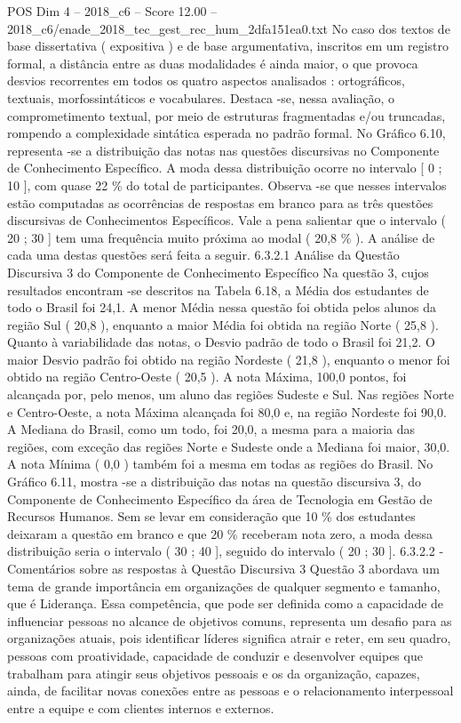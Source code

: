 \begin{textsample}{POS Dim 4 – 2018\_c6 – Score 12.00 – 2018\_c6/enade\_2018\_tec\_gest\_rec\_hum\_2dfa151ea0.txt}
No caso dos textos de base dissertativa ( expositiva ) e de base argumentativa, inscritos em um registro formal, a distância entre as duas modalidades é ainda maior, o que provoca desvios recorrentes em todos os quatro aspectos analisados : ortográficos, textuais, morfossintáticos e vocabulares.
Destaca -se, nessa avaliação, o comprometimento textual, por meio de estruturas fragmentadas e/ou truncadas, rompendo a complexidade sintática esperada no padrão formal.
No Gráfico 6.10, representa -se a distribuição das notas nas questões discursivas no Componente de Conhecimento Específico.
A moda dessa distribuição ocorre no intervalo [ 0 ; 10 ], com quase 22 \% do total de participantes.
Observa -se que nesses intervalos estão computadas as ocorrências de respostas em branco para as três questões discursivas de Conhecimentos Específicos.
Vale a pena salientar que o intervalo ( 20 ; 30 ] tem uma frequência muito próxima ao modal ( 20,8 \% ).
A análise de cada uma destas questões será feita a seguir. 6.3.2.1 Análise da Questão Discursiva 3 do Componente de Conhecimento Específico Na questão 3, cujos resultados encontram -se descritos na Tabela 6.18, a Média dos estudantes de todo o Brasil foi 24,1.
A menor Média nessa questão foi obtida pelos alunos da região Sul ( 20,8 ), enquanto a maior Média foi obtida na região Norte ( 25,8 ).
Quanto à variabilidade das notas, o Desvio padrão de todo o Brasil foi 21,2.
O maior Desvio padrão foi obtido na região Nordeste ( 21,8 ), enquanto o menor foi obtido na região Centro-Oeste ( 20,5 ).
A nota Máxima, 100,0 pontos, foi alcançada por, pelo menos, um aluno das regiões Sudeste e Sul.
Nas regiões Norte e Centro-Oeste, a nota Máxima alcançada foi 80,0 e, na região Nordeste foi 90,0.
A Mediana do Brasil, como um todo, foi 20,0, a mesma para a maioria das regiões, com exceção das regiões Norte e Sudeste onde a Mediana foi maior, 30,0.
A nota Mínima ( 0,0 ) também foi a mesma em todas as regiões do Brasil.
No Gráfico 6.11, mostra -se a distribuição das notas na questão discursiva 3, do Componente de Conhecimento Específico da área de Tecnologia em Gestão de Recursos Humanos.
Sem se levar em consideração que 10 \% dos estudantes deixaram a questão em branco e que 20 \% receberam nota zero, a moda dessa distribuição seria o intervalo ( 30 ; 40 ], seguido do intervalo ( 20 ; 30 ]. 6.3.2.2 - Comentários sobre as respostas à Questão Discursiva 3 Questão 3 abordava um tema de grande importância em organizações de qualquer segmento e tamanho, que é Liderança.
Essa competência, que pode ser definida como a capacidade de influenciar pessoas no alcance de objetivos comuns, representa um desafio para as organizações atuais, pois identificar líderes significa atrair e reter, em seu quadro, pessoas com proatividade, capacidade de conduzir e desenvolver equipes que trabalham para atingir seus objetivos pessoais e os da organização, capazes, ainda, de facilitar novas conexões entre as pessoas e o relacionamento interpessoal entre a equipe e com clientes internos e externos.

\end{textsample}
